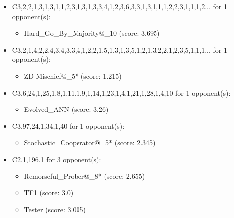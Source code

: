 \begin{appendices}
\begin{itemize}
    \item C3,2,2,1,3,1,3,1,1,2,3,1,3,1,3,3,4,1,2,3,6,3,3,1,3,1,1,1,2,2,3,1,1,1,2... for 1 opponent(s):
    \begin{multicols}{3}
         \begin{itemize}
            \item Hard\_Go\_By\_Majority@\_10 (score: 3.695)
        \end{itemize}
     \end{multicols}
     
    \item C3,2,1,4,2,2,4,3,4,3,3,4,1,2,2,1,5,1,3,1,3,5,1,2,1,3,2,2,1,2,3,5,1,1,1... for 1 opponent(s):
    \begin{multicols}{3}
         \begin{itemize}
            \item ZD-Mischief@\_5* (score: 1.215)
        \end{itemize}
     \end{multicols}
     
    \item C3,6,24,1,25,1,8,1,11,1,9,1,14,1,23,1,4,1,21,1,28,1,4,10 for 1 opponent(s):
    \begin{multicols}{3}
         \begin{itemize}
            \item Evolved\_ANN (score: 3.26)
        \end{itemize}
     \end{multicols}
     
    \item C3,97,24,1,34,1,40 for 1 opponent(s):
    \begin{multicols}{3}
         \begin{itemize}
            \item Stochastic\_Cooperator@\_5* (score: 2.345)
        \end{itemize}
     \end{multicols}
     
    \item C2,1,196,1 for 3 opponent(s):
    \begin{multicols}{3}
         \begin{itemize}
            \item Remorseful\_Prober@\_8* (score: 2.655)
            \item TF1 (score: 3.0)
            \item Tester (score: 3.005)
        \end{itemize}
     \end{multicols}
     

\end{itemize}
\end{appendices}
